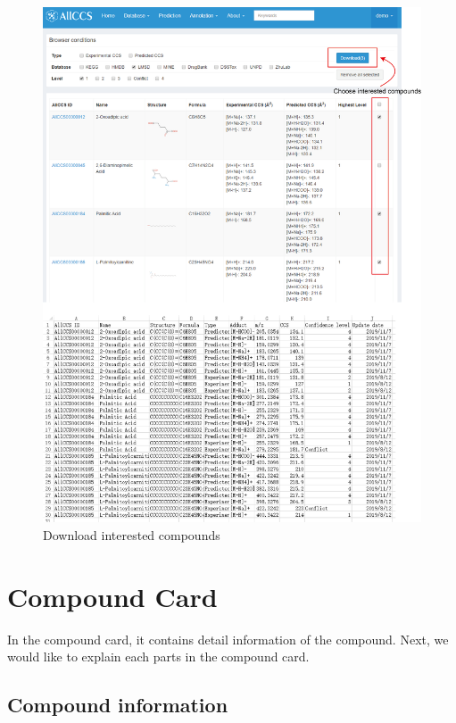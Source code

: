 \documentclass[12pt,]{book}
\theoremstyle{definition}
\theoremstyle{definition}
\theoremstyle{definition}
\theoremstyle{remark}
\begin{document}
\begin{figure}

{\centering \includegraphics{images/chapter2/figure2.2browser_download_new} 

}

\caption{Download interested compounds}\label{fig:figure2d2}
\end{figure}

\section{Compound Card}\label{chapter2d2}

In the compound card, it contains detail information of the compound.
Next, we would like to explain each parts in the compound card.

\subsection{Compound information}\label{chapter2d2d1}
\end{document}
